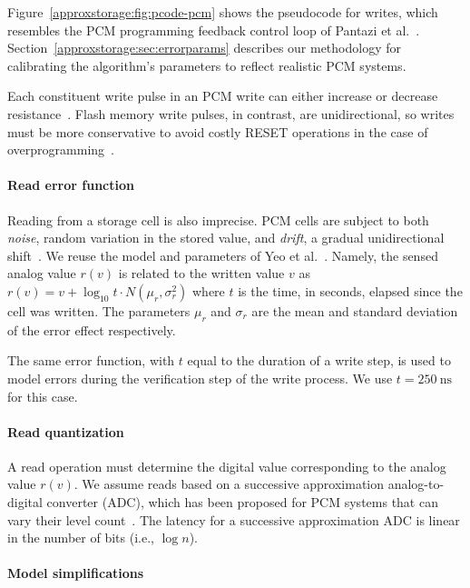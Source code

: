 Figure~\ref{approxstorage:fig:pcode-pcm} shows the pseudocode for
writes, which resembles the PCM programming feedback
control loop of Pantazi et al.~\cite{mlcmodelchar}.
Section~\ref{approxstorage:sec:errorparams} describes our methodology for
calibrating the algorithm's parameters to reflect realistic PCM
systems.

Each constituent write pulse in an PCM write can either increase or decrease
resistance~\cite{mlcprogalgo,mlcibm,mlcmodelchar}.
Flash memory write pulses, in contrast, are unidirectional, so writes
must be more conservative to avoid costly RESET operations
in the case of overprogramming~\cite{ispp}.

\paragraph{Read error function}

Reading from a storage cell is also imprecise. PCM
cells are subject to both \emph{noise}, random variation in the stored value,
and \emph{drift}, a gradual unidirectional
shift~\cite{mlcpcmreliability}. We reuse the model and parameters of
Yeo et al.~\cite{wdddmlcpcm}. Namely, the sensed
analog value $r(v)$ is related to the written value $v$ as
$r(v) = v + \log_{10} t \cdot N(\mu_r, \sigma_r^2)$
where $t$ is the time, in seconds, elapsed since the cell was written.
The parameters $\mu_r$ and $\sigma_r$ are the mean and standard
deviation of the error effect respectively.

The same error function, with $t$ equal to the duration of a write step,
is used to model errors during the verification step of the write
process. We use $t = 250~\mathrm{ns}$~\cite{writecancel,improvingwrites} for
this case.

\paragraph{Read quantization}

A read operation must determine the digital value corresponding to the
analog value $r(v)$. We assume reads based on a successive
approximation analog-to-digital converter (ADC), which has been proposed for PCM
systems that can vary their level count~\cite{morphablepcm}. The
latency for a successive approximation ADC is linear in the number of
bits (i.e., $\log n$).

\paragraph{Model simplifications}

